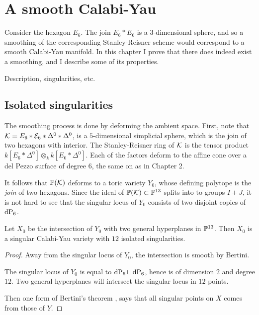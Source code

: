 
\chapter{A smooth Calabi-Yau}

Consider the hexagon $E_6$. The join $E_6 \ast E_6$ is a $3$-dimensional sphere, and so a smoothing of the corresponding Stanley-Reisner scheme would correspond to a smooth Calabi-Yau manifold. In this chapter I prove that there does indeed exist a smoothing, and I describe some of its properties.

Description, singularities, etc.

\section{Isolated singularities}

The smoothing process is done by deforming the ambient space. First, note that $\mathcal K= E_6 \ast \mathcal E_6 \ast \Delta^0 \ast \Delta^0$, is a $5$-dimensional simplicial sphere, which is the join of two hexagons with interior. The Stanley-Reisner ring of $\mathcal K$ is the tensor product $k[E_6 \ast \Delta^0] \otimes_k k[E_6 \ast \Delta^0]$. Each of the factors deform to the affine cone over a del Pezzo surface of degree $6$, the same on as in Chapter 2.

It follows that $\mathbb{P}(\mathcal K)$ deforms to a toric variety $Y_0$, whose defining polytope is the \emph{join} of two hexagons. Since the ideal of $\mathbb{P}(\mathcal K) \subset \mathbb{P}^{13}$ splits into to groups $I+J$, it is not hard to see that the singular locus of $Y_0$ consists of two disjoint copies of $\dP6$. 

\begin{lemma}
Let $X_0$ be the intersection of $Y_0$ with two general hyperplanes in $\mathbb{P}^{13}$. Then $X_0$ is a singular Calabi-Yau variety with $12$ isolated singularities.
\end{lemma}
\begin{proof}
Away from the singular locus of $Y_0$, the intersection is smooth by Bertini.

The singular locus of $Y_0$ is equal to $\dP6 \sqcup \dP6$, hence is of dimension $2$ and degree $12$. Two general hyperplanes will intersect the singular locus in $12$ points. 

Then one form of Bertini's theorem \cite[page 216]{harris_alggeo}, says that all singular points on $X$ comes from those of $Y$. 
\end{proof}

